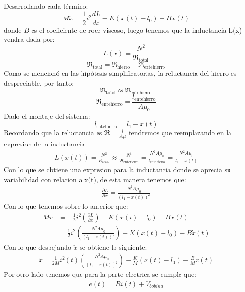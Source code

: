 \documentclass[
  11pt,
  letterpaper,
   addpoints,
  ]{exam}
\newcommand{\Rel}{\mathfrak{R}} %
\begin{document}
\begin{solution}
      Desarrollando cada término:
      \begin{equation}
        M \ddot{x} = \frac{1}{2} i^2 \frac{dL}{dx} - K(x(t)-l_0) - B \dot{x}(t)
      \end{equation}
      donde $B$ es el coeficiente de roce viscoso, luego tenemos que la inductancia L(x) vendra dada por:
      \begin{equation}
        L(x) = \frac{N^2}{\Rel_{\text{total}}}
      \end{equation}
      \begin{equation}
        \Rel_{\text{total}} = \Rel_{\text{hierro}} + \Rel_{\text{entehierro}}
      \end{equation}
      Como se mencionó en las hipótesis simplificatorias, la reluctancia del hierro es despreciable, por tanto:
      \begin{equation}
        \Rel_{\text{total}} \approx \Rel_{\text{entehierro}}
      \end{equation}
      \begin{equation}
        \Rel_{\text{entehierro}} = \frac{l_{\text{entehierro}}}{A \mu_0}
      \end{equation}
      Dado el montaje del sistema:
      \begin{equation}
        l_{\text{entehierro}} = l_1 - x(t)
      \end{equation}
    Recordando que la reluctancia es $\Rel= \frac{l}{A\mu}$ tendremos que reemplazando en la expresion de la inductancia.
    \begin{align}
      L(x(t)) = \frac{N^{2}}{R_{total}} \approx \frac{N^{2}}{\Rel_{\text{entehierro}}} = \frac{N^{2} A \mu_0}{l_{\text{entehierro}}} = \frac{N^{2} A \mu_0}{l_1 - x(t)}
    \end{align}
    Con lo que se obtiene una expresion para la inductancia donde se aprecia su variabilidad con relacion a x(t), de esta manera tenemos que:
    \begin{align}
        \frac{\partial L}{\partial x} = \frac{N^{2} A \mu_0}{(l_1 - x(t))^2}
    \end{align}
    Con lo que tenemos sobre lo anterior que:
    \begin{align}
      M \ddot{x} &= -\frac{1}{2} i^2 \left(\frac{\partial L}{\partial x}\right) - K(x(t)-l_0) - B \dot{x}(t)\\
      &= \frac{1}{2}i^{2}\left(\frac{N^{2}A\mu_0}{(l_1-x(t))^2}\right) - K(x(t)-l_0) - B \dot{x}(t)
    \end{align}
    Con lo que despejando $ \ddot{x}$ se obtiene lo siguiente:
    \begin{align}
      \ddot{x} = \frac{1}{2M}i^{2}(t) \left(\frac{N^{2}A\mu_0}{(l_1-x(t))^2}\right) - \frac{K}{M}(x(t)-l_0) - \frac{B}{M} \dot{x}(t)
    \end{align}
    Por otro lado tenemos que para la parte electrica se cumple que:
    \begin{align}
      e(t) = R i(t) + V_{bobina} 
    \end{align}
\end{solution}
\end{document}
